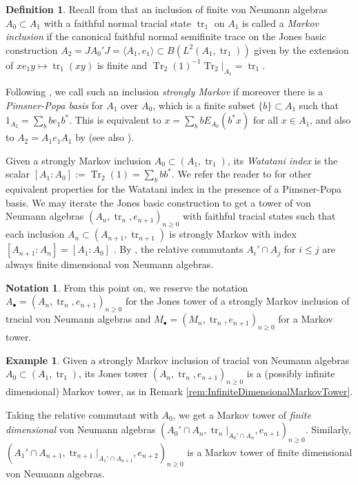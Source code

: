 \documentclass[11pt]{article}
\theoremstyle{plain}
\theoremstyle{definition}
\newtheorem{defn}[thm]{Definition}
\newtheorem{nota}[thm]{Notation}
\newtheorem{ex}[thm]{Example}
\DeclareMathOperator{\Tr}{Tr}
\DeclareMathOperator{\tr}{tr}
\begin{document}
\begin{defn}
\label{def:StronglyMarkovInclusion}
Recall from \cite{MR1278111} that an inclusion of finite von Neumann algebras $A_0\subset A_1$ with a faithful normal tracial state $\tr_1$ on $A_1$ is called a \emph{Markov inclusion} 
if
the canonical faithful normal semifinite trace on the Jones basic construction $A_2 = JA_0'J = \langle A_1, e_1\rangle \subset B(L^2(A_1, \tr_1))$ given by the extension of $xe_1y \mapsto \tr_1(xy)$ is finite and $\Tr_2(1)^{-1}\Tr_2|_{A_1}=\tr_1$.

Following \cite{MR2812459}, we call such an inclusion \emph{strongly Markov} if moreover there is a \emph{Pimsner-Popa basis} for $A_1$ over $A_0$, which is a finite subset $\{b\}\subset A_1$ such that $1_{A_2} = \sum_b b e_1b^*$.
This is equivalent to $x = \sum_b b E_{A_0}(b^*x)$ for all $x\in A_1$, and also to $A_2 = A_1e_1A_1$ by \cite[Prop.~3(b)]{MR561983}
(see also \cite{MR996807}).

Given a strongly Markov inclusion $A_0\subset (A_1, \tr_1)$, 
its \emph{Watatani index} \cite{MR996807} is the scalar $[A_1:A_0]:=\Tr_2(1) = \sum_b bb^* $.
We refer the reader to \cite[1.1.4(c)]{MR1278111} for other equivalent properties for the Watatani index in the presence of a Pimsner-Popa basis. 
We may iterate the Jones basic construction to get a tower of von Neumann algebras $(A_n ,\tr_n, e_{n+1})_{n\geq 0}$ with faithful tracial states such that each inclusion $A_{n}\subset (A_{n+1}, \tr_{n+1})$ is strongly Markov with index $[A_{n+1}: A_n] = [A_1:A_0]$ \cite{MR2812459}.
By \cite[Prop.~2.7.3]{MR996807}, the relative commutants $A_i' \cap A_j$ for $i\leq j$ are always finite dimensional von Neumann algebras.
\end{defn}

\begin{nota}
From this point on, we reserve the notation $A_\bullet=(A_n,\tr_n, e_{n+1})_{n\geq 0}$ for the Jones tower of a strongly Markov inclusion of tracial von Neumann algebras and $M_\bullet = (M_n, \tr_n, e_{n+1})_{n\geq 0}$ for a Markov tower.
\end{nota}

\begin{ex}
 Given a strongly Markov inclusion of tracial von Neumann algebras $A_0\subset (A_1, \tr_1)$, its Jones tower $(A_n, \tr_n, e_{n+1})_{n\geq 0}$ is a (possibly infinite dimensional) Markov tower, as in Remark \ref{rem:InfiniteDimensionalMarkovTower}.

Taking the relative commutant with $A_0$, we get a Markov tower of \emph{finite dimensional} von Neumann algebras $(A_0'\cap A_n , \tr_n|_{A_0'\cap A_n} , e_{n+1})_{n\geq 0}$.
Similarly, $(A_1'\cap A_{n+1} , \tr_{n+1}|_{A_1'\cap A_{n+1}} , e_{n+2})_{n\geq 0}$ is a Markov tower of finite dimensional von Neumann algebras.
\end{ex}
\end{document}
